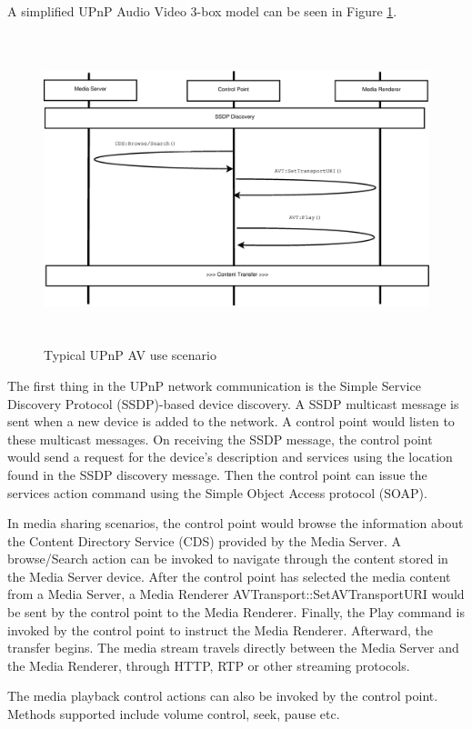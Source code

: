A simplified UPnP Audio Video 3-box model \cite{DLNA_proxy} can be 
seen in Figure \ref{av_use_scenario}.
\begin{figure}[htb] 
\centering \includegraphics[height=9cm]{charts/chart1} 
\caption{Typical UPnP AV use scenario \label{av_use_scenario}} 
\end{figure} 
The first thing in the UPnP network communication is the Simple Service
Discovery Protocol (SSDP)-based device discovery. A SSDP multicast message is
sent when a new device is added to the network. A control point would listen to these 
multicast messages. On receiving the SSDP message, the control point would send a request for the device's description and services using the location found in the SSDP discovery message. Then the control point can issue the services action command using the Simple Object Access protocol (SOAP).

In media sharing scenarios, the control point would browse the information about 
the Content Directory Service (CDS) provided by the Media Server. A 
browse/Search action can be invoked to navigate through the content stored in 
the Media Server device. After the control point has selected the media content from 
a Media Server, a Media Renderer AVTransport::SetAVTransportURI would be sent by 
the control point to the Media Renderer. Finally, the Play command is invoked by 
the control point to instruct the Media Renderer. Afterward, the transfer begins. The media 
stream travels directly between the Media Server and the Media Renderer, through HTTP, 
RTP or other streaming protocols.

The media playback control actions can also be invoked by the control point. Methods 
supported include volume control, seek, pause etc. 


